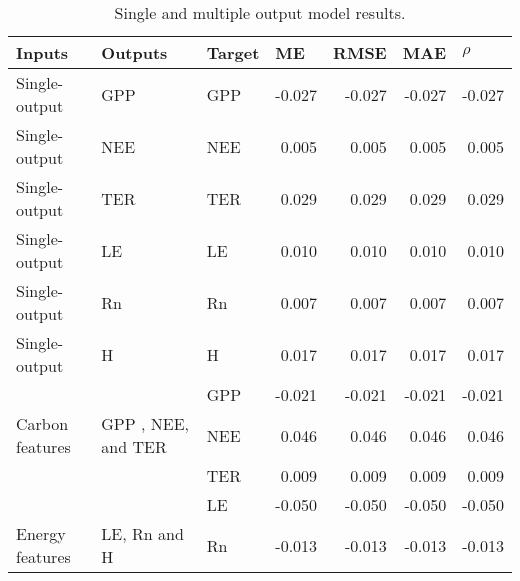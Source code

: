 \begin{table}[htbp]

\caption{Single and multiple output model results.}

\begin{center}

  \begin{tabular}{|l|l|l|r|r|r|r|}

    \hline

    Inputs & Outputs & Target & \multicolumn{1}{l|}{ME} & \multicolumn{1}{l|}{RMSE} & \multicolumn{1}{l|}{MAE} & \multicolumn{1}{l|}{$\rho$} \\ \hline

    Single-output & GPP & GPP & -0.027 & -0.027 & -0.027 & -0.027 \\ \hline

    Single-output & NEE  & NEE & 0.005 & 0.005 & 0.005 & 0.005 \\ \hline

    Single-output & TER  & TER & 0.029 & 0.029 & 0.029 & 0.029 \\ \hline

    Single-output & LE  & LE & 0.010 & 0.010 & 0.010 & 0.010 \\ \hline

    Single-output & Rn  & Rn & 0.007 & 0.007 & 0.007 & 0.007 \\ \hline

    Single-output & H   & H & 0.017 & 0.017 & 0.017 & 0.017 \\ \hline

    \multicolumn{ 1}{|c|}{} & \multicolumn{ 1}{c|}{} & GPP & -0.021 & -0.021 & -0.021 & -0.021 \\ \cline{ 3- 6}

    \multicolumn{ 1}{|l|}{Carbon features} & \multicolumn{ 1}{l|}{GPP , NEE, and TER} & NEE & 0.046 & 0.046 & 0.046 & 0.046 \\ \cline{ 3- 6}

    \multicolumn{ 1}{|l|}{} & \multicolumn{ 1}{l|}{} & TER & 0.009 & 0.009 & 0.009 & 0.009 \\ \hline

    \multicolumn{ 1}{|c|}{} & \multicolumn{ 1}{c|}{} & LE & -0.050 & -0.050 & -0.050 & -0.050 \\ \cline{ 3- 6}

    \multicolumn{ 1}{|l|}{Energy features} & \multicolumn{ 1}{l|}{LE, Rn and H} &  Rn & -0.013 & -0.013 & -0.013 & -0.013 \\ \cline{ 3- 6}


\end{tabular}
\end{center}
\end{table}
